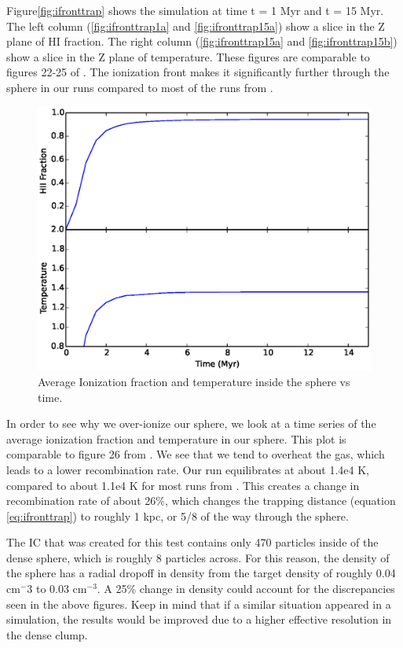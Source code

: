 Figure\ref{fig:ifronttrap} shows the simulation at time t = 1 Myr and t = 15 Myr. The left column (\ref{fig:ifronttrap1a} and \ref{fig:ifronttrap15a}) show a slice in the Z plane of HI fraction. The right column (\ref{fig:ifronttrap15a} and \ref{fig:ifronttrap15b}) show a slice in the Z plane of temperature. These figures are comparable to figures 22-25 of \citet{ilievEt06}. The ionization front makes it significantly further through the sphere in our runs compared to most of the runs from \citet{ilievEt06}.

\begin{figure}
\includegraphics[width = \textwidth]{graphics/timeseries.eps}
\caption[HII and Temperature vs time.]{Average Ionization fraction and temperature inside the sphere vs time.}
\end{figure}

In order to see why we over-ionize our sphere, we look at a time series of the average ionization fraction and temperature in our sphere. This plot is comparable to figure 26 from \citet{ilievEt06}. We see that we tend to overheat the gas, which leads to a lower recombination rate. Our run equilibrates at about 1.4e4 K, compared to about 1.1e4 K for most runs from \citet{ilievEt06}. This creates a change in recombination rate of about 26\%, which changes the trapping distance (equation \ref{eq:ifronttrap}) to roughly 1 kpc, or 5/8 of the way through the sphere.

The IC that was created for this test contains only 470 particles inside of the dense sphere, which is roughly 8 particles across. For this reason, the density of the sphere has a radial dropoff in density from the target density of roughly 0.04 cm$^-3$ to 0.03 cm$^{-3}$. A 25\% change in density could account for the discrepancies seen in the above figures. Keep in mind that if a similar situation appeared in a simulation, the results would be improved due to a higher effective resolution in the dense clump.


